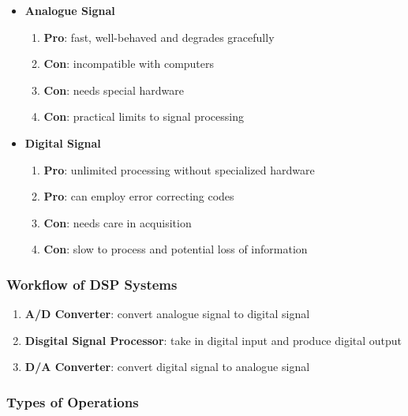       \begin{itemize}
        \item \textbf{Analogue Signal}
        \begin{enumerate}
          \item \textbf{Pro}: fast, well-behaved and degrades gracefully
          \item \textbf{Con}: incompatible with computers
          \item \textbf{Con}: needs special hardware
          \item \textbf{Con}: practical limits to signal processing
        \end{enumerate}

        \item \textbf{Digital Signal}
        \begin{enumerate}
          \item \textbf{Pro}: unlimited processing without specialized hardware
          \item \textbf{Pro}: can employ error correcting codes
          \item \textbf{Con}: needs care in acquisition
          \item \textbf{Con}: slow to process and potential loss of information
        \end{enumerate}
      \end{itemize}

    \subsubsection{Workflow of DSP Systems}

      \begin{enumerate}
        \item \textbf{A/D Converter}: convert analogue signal to digital signal
        \item \textbf{Disgital Signal Processor}: take in digital input and
        produce digital output
        \item \textbf{D/A Converter}: convert digital signal to analogue signal
      \end{enumerate}

    \subsubsection{Types of Operations}

